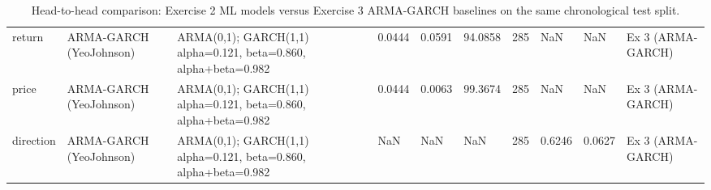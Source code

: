 \begin{table}[H]
\begin{tabular}{llllllllll}
return & ARMA-GARCH (YeoJohnson) & ARMA(0,1); GARCH(1,1) alpha=0.121, beta=0.860, alpha+beta=0.982 & 0.0444 & 0.0591 & 94.0858 & 285 & NaN & NaN & Ex 3 (ARMA-GARCH) \\
price & ARMA-GARCH (YeoJohnson) & ARMA(0,1); GARCH(1,1) alpha=0.121, beta=0.860, alpha+beta=0.982 & 0.0444 & 0.0063 & 99.3674 & 285 & NaN & NaN & Ex 3 (ARMA-GARCH) \\
direction & ARMA-GARCH (YeoJohnson) & ARMA(0,1); GARCH(1,1) alpha=0.121, beta=0.860, alpha+beta=0.982 & NaN & NaN & NaN & 285 & 0.6246 & 0.0627 & Ex 3 (ARMA-GARCH) \\
\bottomrule
\end{tabular}
\caption{Head-to-head comparison: Exercise 2 ML models versus Exercise 3 ARMA-GARCH baselines on the same chronological test split.}
\label{tab:ex3_combined}
\end{table}
